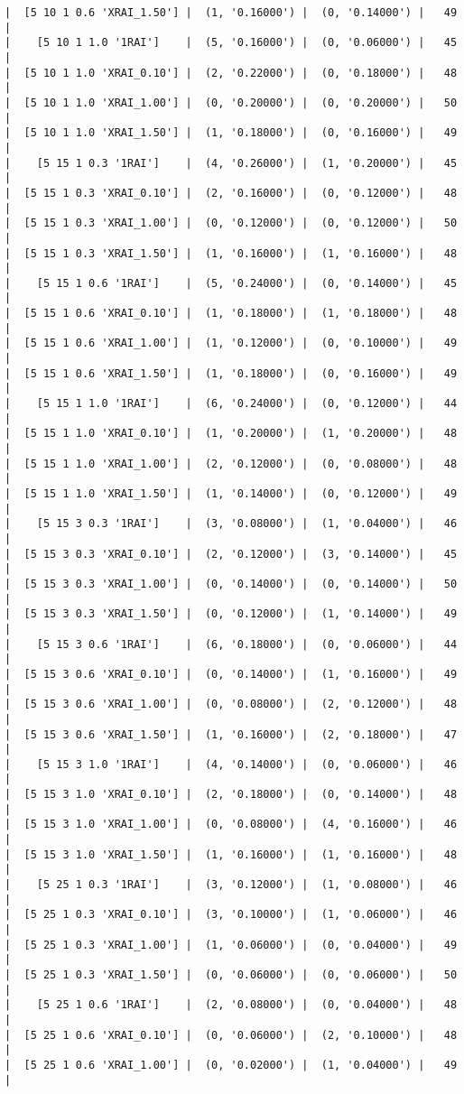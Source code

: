 \documentclass{article}
\begin{document}
\begin{verbatim}
|  [5 10 1 0.6 'XRAI_1.50'] |  (1, '0.16000') |  (0, '0.14000') |   49  |
|    [5 10 1 1.0 '1RAI']    |  (5, '0.16000') |  (0, '0.06000') |   45  |
|  [5 10 1 1.0 'XRAI_0.10'] |  (2, '0.22000') |  (0, '0.18000') |   48  |
|  [5 10 1 1.0 'XRAI_1.00'] |  (0, '0.20000') |  (0, '0.20000') |   50  |
|  [5 10 1 1.0 'XRAI_1.50'] |  (1, '0.18000') |  (0, '0.16000') |   49  |
|    [5 15 1 0.3 '1RAI']    |  (4, '0.26000') |  (1, '0.20000') |   45  |
|  [5 15 1 0.3 'XRAI_0.10'] |  (2, '0.16000') |  (0, '0.12000') |   48  |
|  [5 15 1 0.3 'XRAI_1.00'] |  (0, '0.12000') |  (0, '0.12000') |   50  |
|  [5 15 1 0.3 'XRAI_1.50'] |  (1, '0.16000') |  (1, '0.16000') |   48  |
|    [5 15 1 0.6 '1RAI']    |  (5, '0.24000') |  (0, '0.14000') |   45  |
|  [5 15 1 0.6 'XRAI_0.10'] |  (1, '0.18000') |  (1, '0.18000') |   48  |
|  [5 15 1 0.6 'XRAI_1.00'] |  (1, '0.12000') |  (0, '0.10000') |   49  |
|  [5 15 1 0.6 'XRAI_1.50'] |  (1, '0.18000') |  (0, '0.16000') |   49  |
|    [5 15 1 1.0 '1RAI']    |  (6, '0.24000') |  (0, '0.12000') |   44  |
|  [5 15 1 1.0 'XRAI_0.10'] |  (1, '0.20000') |  (1, '0.20000') |   48  |
|  [5 15 1 1.0 'XRAI_1.00'] |  (2, '0.12000') |  (0, '0.08000') |   48  |
|  [5 15 1 1.0 'XRAI_1.50'] |  (1, '0.14000') |  (0, '0.12000') |   49  |
|    [5 15 3 0.3 '1RAI']    |  (3, '0.08000') |  (1, '0.04000') |   46  |
|  [5 15 3 0.3 'XRAI_0.10'] |  (2, '0.12000') |  (3, '0.14000') |   45  |
|  [5 15 3 0.3 'XRAI_1.00'] |  (0, '0.14000') |  (0, '0.14000') |   50  |
|  [5 15 3 0.3 'XRAI_1.50'] |  (0, '0.12000') |  (1, '0.14000') |   49  |
|    [5 15 3 0.6 '1RAI']    |  (6, '0.18000') |  (0, '0.06000') |   44  |
|  [5 15 3 0.6 'XRAI_0.10'] |  (0, '0.14000') |  (1, '0.16000') |   49  |
|  [5 15 3 0.6 'XRAI_1.00'] |  (0, '0.08000') |  (2, '0.12000') |   48  |
|  [5 15 3 0.6 'XRAI_1.50'] |  (1, '0.16000') |  (2, '0.18000') |   47  |
|    [5 15 3 1.0 '1RAI']    |  (4, '0.14000') |  (0, '0.06000') |   46  |
|  [5 15 3 1.0 'XRAI_0.10'] |  (2, '0.18000') |  (0, '0.14000') |   48  |
|  [5 15 3 1.0 'XRAI_1.00'] |  (0, '0.08000') |  (4, '0.16000') |   46  |
|  [5 15 3 1.0 'XRAI_1.50'] |  (1, '0.16000') |  (1, '0.16000') |   48  |
|    [5 25 1 0.3 '1RAI']    |  (3, '0.12000') |  (1, '0.08000') |   46  |
|  [5 25 1 0.3 'XRAI_0.10'] |  (3, '0.10000') |  (1, '0.06000') |   46  |
|  [5 25 1 0.3 'XRAI_1.00'] |  (1, '0.06000') |  (0, '0.04000') |   49  |
|  [5 25 1 0.3 'XRAI_1.50'] |  (0, '0.06000') |  (0, '0.06000') |   50  |
|    [5 25 1 0.6 '1RAI']    |  (2, '0.08000') |  (0, '0.04000') |   48  |
|  [5 25 1 0.6 'XRAI_0.10'] |  (0, '0.06000') |  (2, '0.10000') |   48  |
|  [5 25 1 0.6 'XRAI_1.00'] |  (0, '0.02000') |  (1, '0.04000') |   49  |

\end{verbatim}
\end{document}

